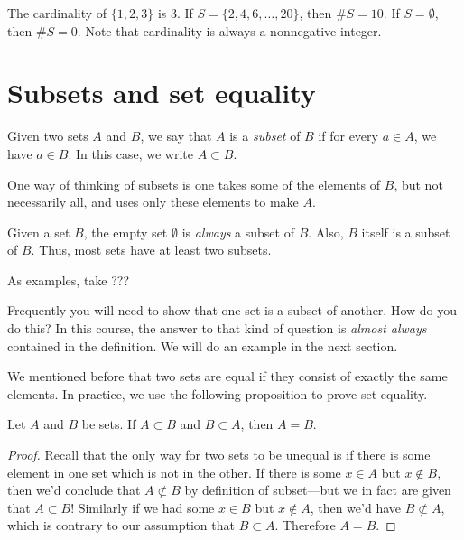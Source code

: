 \documentclass{tufte-book}
\begin{document}
The cardinality of $\{1, 2, 3\}$ is 3. If $S = \{2, 4, 6, \dots, 20\}$, then $\# S = 10$. If $S = \emptyset$, then $\# S = 0$. Note that cardinality is always a nonnegative integer. 

\section{Subsets and set equality}
\label{sec:subsets}

\begin{definition}
  Given two sets $A$ and $B$, we say that $A$ is a \emph{subset}  of $B$ if for every $a \in A$, we have $a \in B$. In this case, we write $A \subset B$. 
\end{definition}
One way of thinking of subsets is one takes some of the elements of $B$, but not necessarily all, and uses only these elements to make $A$.

Given a set $B$, the empty set $\emptyset$ is \emph{always} a subset of $B$. Also, $B$ itself is a subset of $B$. Thus, most sets have at least two subsets.

As examples, take ???

Frequently you will need to show that one set is a subset of another. How do you do this? In this course, the answer to that kind of question is \emph{almost always} contained in the definition. We will do an example in the next section.

We mentioned before that two sets are equal if they consist of exactly the same elements. In practice, we use the following proposition to prove set equality.
\begin{proposition}
  Let $A$ and $B$ be sets. If $A \subset B$ and $B \subset A$, then $A = B$. 
\end{proposition}

\begin{proof}
  Recall that the only way for two sets to be unequal is if there is some element in one set which is not in the other. If there is some $x \in A$ but $x \notin B$, then we'd conclude that $A \not\subset B$ by definition of subset---but we in fact are given that $A \subset B$! Similarly if we had some $x \in B$ but $x \notin A$, then we'd have $B \not\subset A$, which is contrary to our assumption that $B \subset A$. Therefore $A = B$.
\end{proof}
\end{document}
